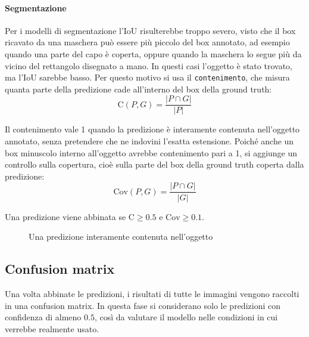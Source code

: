 \paragraph{Segmentazione}
Per i modelli di segmentazione l'IoU risulterebbe troppo severo, visto che il box ricavato da una maschera può essere più piccolo del box annotato, ad esempio quando una parte del capo è coperta,
oppure quando la maschera lo segue più da vicino del rettangolo disegnato a mano. In questi casi l'oggetto è stato trovato, ma l'IoU sarebbe basso.
Per questo motivo si usa il \texttt{contenimento}, che misura quanta parte della predizione cade all'interno del box della ground truth:
$$ \mathrm{C}(P, G) = \frac{|P \cap G|}{|P|} $$

\noindent
Il contenimento vale 1 quando la predizione è interamente contenuta nell'oggetto annotato, senza pretendere che ne indovini l'esatta estensione. Poiché anche un box minuscolo interno all'oggetto avrebbe contenimento pari a 1,
si aggiunge un controllo sulla copertura, cioè sulla parte del box della ground truth coperta dalla predizione:
$$ \mathrm{Cov}(P, G) = \frac{|P \cap G|}{|G|} $$

\noindent
Una predizione viene abbinata se $\mathrm{C} \geq 0.5$ e $\mathrm{Cov} \geq 0.1$. \\

\begin{figure}[htbp]
  \centering
  \caption{Una predizione interamente contenuta nell'oggetto}
  \label{fig:iou_contenimento}
\end{figure}

\newpage

\subsection{Confusion matrix}

\noindent
Una volta abbinate le predizioni, i risultati di tutte le immagini vengono raccolti in una confusion matrix. In questa fase si considerano solo le predizioni con confidenza di almeno $0.5$, così da valutare il modello nelle condizioni
in cui verrebbe realmente usato.

